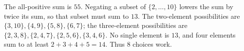 The all-positive sum is $55$. Negating a subset of $\{2,\ldots,10\}$ lowers the sum by twice its sum, so that subset must sum to $13$. The two-element possibilities are $\{3,10\},\{4,9\},\{5,8\},\{6,7\}$; the three-element possibilities are $\{2,3,8\},\{2,4,7\},\{2,5,6\},\{3,4,6\}$. No single element is $13$, and four elements sum to at least $2+3+4+5=14$. Thus $\boxed8$ choices work.
